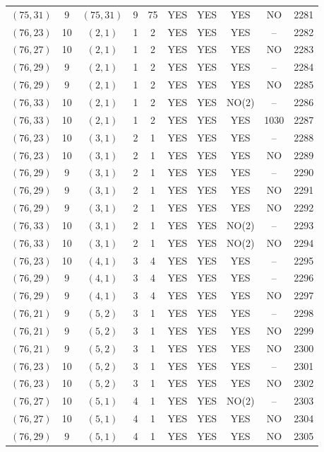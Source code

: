 \begin{longtable}{|c|c|c|c|c|c|c|c|c|c|}
$(75, 31)$ & 9 & $(75, 31)$ & 9 & 75 & YES & YES & YES & NO & 2281\\
$(76, 23)$ & 10 & $(2, 1)$ & 1 & 2 & YES & YES & YES & -- & 2282\\
$(76, 27)$ & 10 & $(2, 1)$ & 1 & 2 & YES & YES & YES & NO & 2283\\
$(76, 29)$ & 9 & $(2, 1)$ & 1 & 2 & YES & YES & YES & -- & 2284\\
$(76, 29)$ & 9 & $(2, 1)$ & 1 & 2 & YES & YES & YES & NO & 2285\\
$(76, 33)$ & 10 & $(2, 1)$ & 1 & 2 & YES & YES & NO(2) & -- & 2286\\
$(76, 33)$ & 10 & $(2, 1)$ & 1 & 2 & YES & YES & YES & 1030 & 2287\\
$(76, 23)$ & 10 & $(3, 1)$ & 2 & 1 & YES & YES & YES & -- & 2288\\
$(76, 23)$ & 10 & $(3, 1)$ & 2 & 1 & YES & YES & YES & NO & 2289\\
$(76, 29)$ & 9 & $(3, 1)$ & 2 & 1 & YES & YES & YES & -- & 2290\\
$(76, 29)$ & 9 & $(3, 1)$ & 2 & 1 & YES & YES & YES & NO & 2291\\
$(76, 29)$ & 9 & $(3, 1)$ & 2 & 1 & YES & YES & YES & NO & 2292\\
$(76, 33)$ & 10 & $(3, 1)$ & 2 & 1 & YES & YES & NO(2) & -- & 2293\\
$(76, 33)$ & 10 & $(3, 1)$ & 2 & 1 & YES & YES & NO(2) & NO & 2294\\
$(76, 23)$ & 10 & $(4, 1)$ & 3 & 4 & YES & YES & YES & -- & 2295\\
$(76, 29)$ & 9 & $(4, 1)$ & 3 & 4 & YES & YES & YES & -- & 2296\\
$(76, 29)$ & 9 & $(4, 1)$ & 3 & 4 & YES & YES & YES & NO & 2297\\
$(76, 21)$ & 9 & $(5, 2)$ & 3 & 1 & YES & YES & YES & -- & 2298\\
$(76, 21)$ & 9 & $(5, 2)$ & 3 & 1 & YES & YES & YES & NO & 2299\\
$(76, 21)$ & 9 & $(5, 2)$ & 3 & 1 & YES & YES & YES & NO & 2300\\
$(76, 23)$ & 10 & $(5, 2)$ & 3 & 1 & YES & YES & YES & -- & 2301\\
$(76, 23)$ & 10 & $(5, 2)$ & 3 & 1 & YES & YES & YES & NO & 2302\\
$(76, 27)$ & 10 & $(5, 1)$ & 4 & 1 & YES & YES & NO(2) & -- & 2303\\
$(76, 27)$ & 10 & $(5, 1)$ & 4 & 1 & YES & YES & YES & NO & 2304\\
$(76, 29)$ & 9 & $(5, 1)$ & 4 & 1 & YES & YES & YES & NO & 2305\\

\end{longtable}
